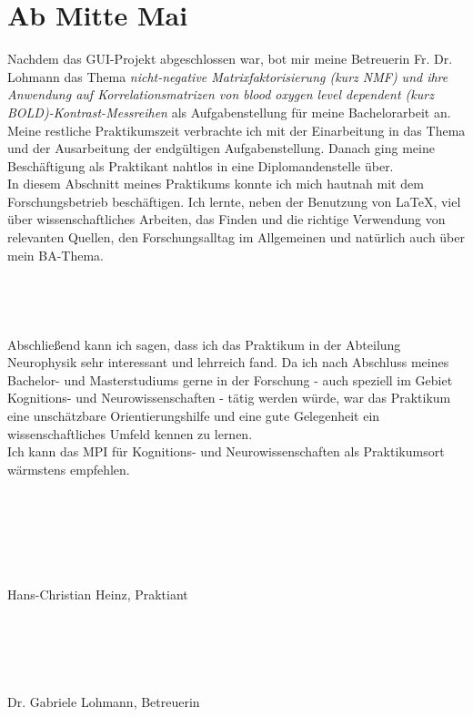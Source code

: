 \documentclass[a4paper,10pt]{article}
\begin{document}
\section{Ab Mitte Mai} 
Nachdem das GUI-Projekt abgeschlossen war, bot mir meine Betreuerin Fr. Dr. Lohmann das Thema \emph{nicht-negative Matrixfaktorisierung (kurz NMF) und ihre Anwendung auf Korrelationsmatrizen von blood oxygen level dependent (kurz BOLD)-Kontrast-Messreihen} als Aufgabenstellung für meine Bachelorarbeit an. Meine restliche Praktikumszeit verbrachte ich mit der Einarbeitung in das Thema und der Ausarbeitung der endgültigen Aufgabenstellung. Danach ging meine Beschäftigung als Praktikant nahtlos in eine Diplomandenstelle über.\\
In diesem Abschnitt meines Praktikums konnte ich mich hautnah mit dem Forschungsbetrieb beschäftigen. Ich lernte, neben der Benutzung von \LaTeX, viel über wissenschaftliches Arbeiten, das Finden und die richtige Verwendung von relevanten Quellen, den Forschungsalltag im Allgemeinen und natürlich auch über mein BA-Thema.\\
\\
\\
\\
\\
Abschließend kann ich sagen, dass ich das Praktikum in der Abteilung Neurophysik sehr interessant und lehrreich fand. Da ich nach Abschluss meines Bachelor- und Masterstudiums gerne in der Forschung - auch speziell im Gebiet Kognitions- und Neurowissenschaften - tätig werden würde, war das Praktikum eine unschätzbare Orientierungshilfe und eine gute Gelegenheit ein wissenschaftliches Umfeld kennen zu lernen.\\
Ich kann das MPI für Kognitions- und Neurowissenschaften als Praktikumsort wärmstens empfehlen.\\
\\
\\
\\
\\
\\
\\
Hans-Christian Heinz, Praktiant\\
\\
\\
\\
\\
\\
Dr. Gabriele Lohmann, Betreuerin
\end{document}
